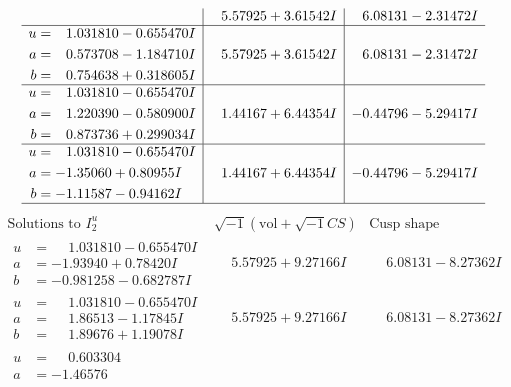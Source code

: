 \documentclass[1p]{elsarticle_modified}
\theoremstyle{definition}
\newcommand{\I}{\sqrt{-1}}
\begin{document}
$$\begin{array}{c|c|c}
 & \phantom{-}5.57925 + 3.61542 I & \phantom{-}6.08131 - 2.31472 I \\ \hline\begin{aligned}
u &= \phantom{-}1.031810 - 0.655470 I \\
a &= \phantom{-}0.573708 - 1.184710 I \\
b &= \phantom{-}0.754638 + 0.318605 I\end{aligned}
 & \phantom{-}5.57925 + 3.61542 I & \phantom{-}6.08131 - 2.31472 I \\ \hline\begin{aligned}
u &= \phantom{-}1.031810 - 0.655470 I \\
a &= \phantom{-}1.220390 - 0.580900 I \\
b &= \phantom{-}0.873736 + 0.299034 I\end{aligned}
 & \phantom{-}1.44167 + 6.44354 I & -0.44796 - 5.29417 I \\ \hline\begin{aligned}
u &= \phantom{-}1.031810 - 0.655470 I \\
a &= -1.35060 + 0.80955 I \\
b &= -1.11587 - 0.94162 I\end{aligned}
 & \phantom{-}1.44167 + 6.44354 I & -0.44796 - 5.29417 I\\
 \hline 
 \end{array}$$\newpage$$\begin{array}{c|c|c}  
\text{Solutions to }I^u_{2}& \I (\text{vol} + \sqrt{-1}CS) & \text{Cusp shape}\\
 \hline 
\begin{aligned}
u &= \phantom{-}1.031810 - 0.655470 I \\
a &= -1.93940 + 0.78420 I \\
b &= -0.981258 - 0.682787 I\end{aligned}
 & \phantom{-}5.57925 + 9.27166 I & \phantom{-}6.08131 - 8.27362 I \\ \hline\begin{aligned}
u &= \phantom{-}1.031810 - 0.655470 I \\
a &= \phantom{-}1.86513 - 1.17845 I \\
b &= \phantom{-}1.89676 + 1.19078 I\end{aligned}
 & \phantom{-}5.57925 + 9.27166 I & \phantom{-}6.08131 - 8.27362 I \\ \hline\begin{aligned}
u &= \phantom{-}0.603304\phantom{ +0.000000I} \\
a &= -1.46576\phantom{ +0.000000I} \\

\end{aligned}
\end{array}$$
\end{document}
